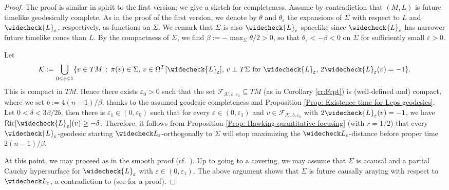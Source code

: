 \documentclass[a4paper,11pt]{article}
\numberwithin{equation}{section}
\theoremstyle{definition}
\theoremstyle{plain}
\newcommand{\eps}{\varepsilon}
\newcommand{\Ric}{\mathrm{Ric}}
\begin{document}
\begin{proof}
    The proof is similar in spirit to the first version; we give a sketch for completeness. 
    Assume by contradiction that $(M,L)$ is future timelike geodesically complete.
    As in the proof of the first version, we denote by $\theta$ and $\theta_\eps$ the expansions of $\Sigma$ with respect to $L$ and $\widecheck{L}_\eps$, respectively, as functions on $\Sigma$. 
    We remark that $\Sigma$ is also $\widecheck{L}_\eps$-spacelike since $\widecheck{L}_\eps$ has narrower future timelike cones than $L$. 
    By the compactness of $\Sigma$, we find $\beta:=-\max_\Sigma \theta/2 >0$, so that $\theta_\varepsilon < -\beta < 0$ on $\Sigma$ for sufficiently small $\eps>0$. 
    
    Let
    \begin{equation*}
        \mathcal K:= \bigcup_{0 \leq \varepsilon \leq 1} \{ v \in TM \,:\, \pi(v) \in \Sigma,\, v \in \Omega^T[\widecheck{L}_\eps],\, v \perp T\Sigma\text{ for } \widecheck{L}_\eps,\, 2\widecheck{L}_\varepsilon(v) = -1\}.
    \end{equation*}
    This is compact in $TM$. 
    Hence there exists $\varepsilon_0 > 0$ such that the set $\mathcal{F}_{\mathcal K, b, \varepsilon_0} \subseteq TM$ (as in Corollary \ref{cr:Fcpt}) is (well-defined and) compact, where we set $b:=4(n-1)/\beta$, thanks to the assumed geodesic completeness and Proposition \ref{Prop: Existence time for Leps geodesics}. 
    Let $0 < \delta < 3\beta/2b$, then there is $\eps_1 \in (0,\eps_0)$ such that for every $\eps \in (0,\eps_1)$ and $v \in \mathcal{F}_{\mathcal K, b, \varepsilon_0}$ with $2\widecheck{L}_\varepsilon(v) = -1$, we have $\Ric[\widecheck{L}_\eps](v) \geq -\delta$. 
    Therefore, it follows from Proposition \ref{Prop: Hawking quantitative focusing} (with $r=1/2$) that every $\widecheck{L}_\eps$-geodesic starting $\widecheck L_\varepsilon$-orthogonally to $\Sigma$ will stop maximizing the $\widecheck L_\varepsilon$-distance before proper time $2(n-1)/\beta$.

    At this point, we may proceed as in the smooth proof \cite[Thm.\ 8.13]{LuMinguzziOhtaSingularity} (cf.\ \cite[Thm.\ 6.49]{Minguzzicausality}). 
    Up to going to a covering, we may assume that $\Sigma$ is acausal and a partial Cauchy hypersurface for $\widecheck{L}_\eps$ with $\eps \in (0,\eps_1)$.
    The above argument shows that $\Sigma$ is future causally araying with respect to $\widecheck L_\varepsilon$, a contradiction to \cite[Thm.\ 8.11]{LuMinguzziOhtaSingularity} (see \cite[Thm.\ 6.48]{Minguzzicausality} for a proof).
\end{proof}
\end{document}
